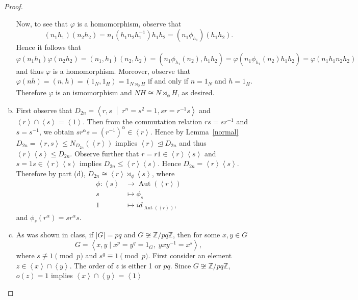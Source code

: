 \documentclass[10pt]{amsart}
\newcommand{\Aut}[1]{\operatorname{Aut}\left(#1\right)}
\newcommand{\abs}[1]{\left| #1 \right|}
\begin{document}
\begin{thm}
\begin{proof}
\begin{enumerate}[(a)]
      Now, to see that $\varphi$ is a homomorphism, observe that 
      $$(n_1h_1)(n_2h_2) = n_1(h_1n_2h_1^{-1})h_1h_2 = (n_1\phi_{h_1})(h_1h_2).$$
      Hence it follows that
      $$\varphi(n_1h_1)\varphi(n_2h_2) = (n_1, h_1)(n_2,h_2) = (n_1\phi_{h_1}(n_2), h_1h_2) = \varphi(n_1\phi_{h_1}(n_2)h_1h_2) = \varphi(n_1h_1n_2h_2)$$
      and thus $\varphi$ is a homomorphism.
      Moreover, observe that $\varphi(nh) = (n,h) = (1_N,1_H) = 1_{N \rtimes_{\phi} H}$ if and only if $n = 1_N$ and $h = 1_H$.
      Therefore $\varphi$ is an ismomorphism and $NH \cong N \rtimes_{\phi} H$, as desired.
    \item
      First observe that $D_{2n} = \left< r, s \;\middle\vert\; r^n = s^2 = 1, sr = r^{-1}s\right>$ and $\left<r\right> \cap \left<s\right> = \left<1\right>$.
      Then from the commutation relation $rs = sr^{-1}$ and $s = s^{-1}$, we obtain $sr^\alpha s = (r^{-1})^\alpha \in \left<r\right>$.
      Hence by Lemma~\ref{normal} $D_{2n} = \left<r, s\right> \leq N_{D_{2n}}(\left<r\right>)$ implies $\left<r\right> \unlhd D_{2n}$ and thus $\left<r\right>\left<s\right> \leq D_{2n}$.
      Observe further that $r = r1 \in \left<r\right>\left<s\right>$ and $s = 1s \in \left<r\right>\left<s\right>$ implies $D_{2n} \leq \left<r\right>\left<s\right>$.
      Hence $D_{2n} = \left<r\right>\left<s\right>$.
      Therefore by part (d), $D_{2n} \cong \left<r\right> \rtimes_{\phi} \left<s\right>$, where 
      \begin{align*}
        \phi \colon \left<s\right> &\rightarrow \Aut{\left<r\right>}\\
        s &\mapsto \phi_{s}\\ 
        1 &\mapsto id_{\Aut{\left<r\right>}},
      \end{align*}
      and $\phi_{s}(r^\alpha) = s r^\alpha s$.
    \item
      As was shown in class, if $\abs{G} = pq$ and $G \not \cong \mathbb{Z}/pq\mathbb{Z}$, then for some $x,y \in G$
      $$G = \left< x, y \mid x^p = y^q = 1_G,\; yxy^{-1} = x^s\right>,$$
      where $s \not \equiv 1 \pmod{p}$ and $s^q \equiv 1 \pmod{p}$.
      First consider an element $z \in \left<x\right> \cap \left<y\right>$.
      The order of $z$ is either 1 or $pq$.
      Since $G \not \cong \mathbb{Z}/pq\mathbb{Z}$, $o(z) = 1$ implies $\left<x\right> \cap \left<y\right> = \left< 1 \right>$


\end{enumerate}
\end{proof}
\end{thm}
\end{document}
